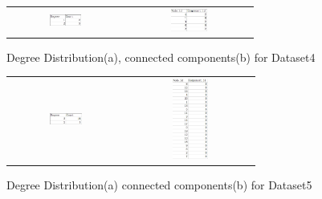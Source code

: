 \begin{figure}[H]
\begin{center}
\begin{tabular}{cc}
     \includegraphics[width=0.3\textwidth]{FIG/4dd.jpg} &
     \includegraphics[width=0.3\textwidth]{FIG/4cc.jpg} \\
\end{tabular}
\caption{Degree Distribution(a), connected components(b) for Dataset4}
\end{center}
\end{figure}

\begin{figure}[H]
\begin{center}
\begin{tabular}{cc}
     \includegraphics[width=0.3\textwidth]{FIG/5dd.jpg} &
     \includegraphics[width=0.3\textwidth]{FIG/5cc.jpg} \\
\end{tabular}
\caption{Degree Distribution(a) connected components(b) for Dataset5}
\end{center}
\end{figure}
